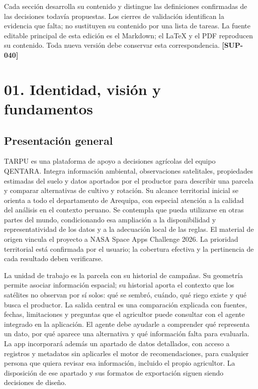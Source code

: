 \documentclass[10pt,a4paper]{article}
\begin{document}
Cada sección desarrolla su contenido y distingue las definiciones confirmadas de las decisiones todavía propuestas. Los cierres de validación identifican la evidencia que falta; no sustituyen su contenido por una lista de tareas. La fuente editable principal de esta edición es el Markdown; el LaTeX y el PDF reproducen su contenido. Toda nueva versión debe conservar esta correspondencia. \textbf{[SUP-040]}


\clearpage\tableofcontents\clearpage

\clearpage\section{01. Identidad, visión y fundamentos}\label{01-identidad-visión-y-fundamentos}

\subsection{Presentación general}

TARPU es una plataforma de apoyo a decisiones agrícolas del equipo QENTARA. Integra información ambiental, observaciones satelitales, propiedades estimadas del suelo y datos aportados por el productor para describir una parcela y comparar alternativas de cultivo y rotación. Su alcance territorial inicial se orienta a todo el departamento de Arequipa, con especial atención a la calidad del análisis en el contexto peruano. Se contempla que pueda utilizarse en otras partes del mundo, condicionando esa ampliación a la disponibilidad y representatividad de los datos y a la adecuación local de las reglas. El material de origen vincula el proyecto a NASA Space Apps Challenge 2026. La prioridad territorial está confirmada por el usuario; la cobertura efectiva y la pertinencia de cada resultado deben verificarse.


La unidad de trabajo es la parcela con su historial de campañas. Su geometría permite asociar información espacial; su historial aporta el contexto que los satélites no observan por sí solos: qué se sembró, cuándo, qué riego existe y qué busca el productor. La salida central es una comparación explicada con fuentes, fechas, limitaciones y preguntas que el agricultor puede consultar con el agente integrado en la aplicación. El agente debe ayudarle a comprender qué representa un dato, por qué aparece una alternativa y qué información falta para evaluarla. La app incorporará además un apartado de datos detallados, con acceso a registros y metadatos sin aplicarles el motor de recomendaciones, para cualquier persona que quiera revisar esa información, incluido el propio agricultor. La disposición de ese apartado y sus formatos de exportación siguen siendo decisiones de diseño.
\end{document}
